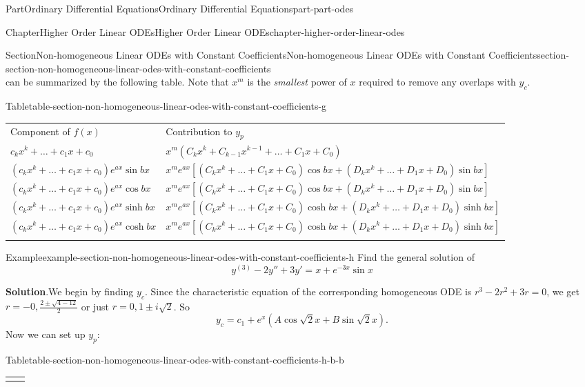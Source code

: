 \documentclass[twoside,10pt,]{book}
\newcommand{\blocktitlefont}{\relax}
\newcommand{\tabularfont}{\relax}
\numberwithin{equation}{part}
\newcommand{\hrulethick} {\noalign{\hrule height 0.11em}}
\newcommand{\brackets}[1]{\left[ #1 \right]}
\begin{document}
\begin{partptx}{Part}{Ordinary Differential Equations}{}{Ordinary Differential Equations}{}{}{part-part-odes}
\begin{chapterptx}{Chapter}{Higher Order Linear ODEs}{}{Higher Order Linear ODEs}{}{}{chapter-higher-order-linear-odes}
\begin{sectionptx}{Section}{Non-homogeneous Linear ODEs with Constant Coefficients}{}{Non-homogeneous Linear ODEs with Constant Coefficients}{}{}{section-section-non-homogeneous-linear-odes-with-constant-coefficients}
\begin{equation*}
\end{equation*}
can be summarized by the following table. Note that \(x^m\) is the \emph{smallest} power of \(x\) required to remove any overlaps with \(y_{c}\).%
\begin{tableptx}{Table}{\textbf{}}{table-section-non-homogeneous-linear-odes-with-constant-coefficients-g}{}%
\centering%
{\tabularfont%
\begin{tabular}{ll}\hrulethick
Component of \(f(x)\)&Contribution to \(y_{p}\)\tabularnewline\hrulethick
\(c_{k}x^{k}+\dots+c_{1}x+c_{0}\)&\(x^{m}(C_{k}x^{k}+C_{k-1}x^{k-1}+\dots+C_{1}x+C_{0})\)\tabularnewline[0pt]
\((c_{k}x^{k}+\dots+c_{1}x+c_{0})e^{ax}\sin bx\)&\(x^{m}e^{ax}\brackets{(C_{k}x^{k}+\dots+C_{1}x+C_{0})\cos bx+(D_{k}x^{k}+\dots+D_{1}x+D_{0})\sin bx}\)\tabularnewline[0pt]
\((c_{k}x^{k}+\dots+c_{1}x+c_{0})e^{ax}\cos bx\)&\(x^{m}e^{ax}\brackets{(C_{k}x^{k}+\dots+C_{1}x+C_{0})\cos bx+(D_{k}x^{k}+\dots+D_{1}x+D_{0})\sin bx}\)\tabularnewline[0pt]
\((c_{k}x^{k}+\dots+c_{1}x+c_{0})e^{ax}\sinh bx\)&\(x^{m}e^{ax}\brackets{(C_{k}x^{k}+\dots+C_{1}x+C_{0})\cosh bx+(D_{k}x^{k}+\dots+D_{1}x+D_{0})\sinh bx}\)\tabularnewline[0pt]
\((c_{k}x^{k}+\dots+c_{1}x+c_{0})e^{ax}\cosh bx\)&\(x^{m}e^{ax}\brackets{(C_{k}x^{k}+\dots+C_{1}x+C_{0})\cosh bx+(D_{k}x^{k}+\dots+D_{1}x+D_{0})\sinh bx}\)\tabularnewline\hrulethick
\end{tabular}
}%
\end{tableptx}%
\begin{example}{Example}{}{example-section-non-homogeneous-linear-odes-with-constant-coefficients-h}%
Find the general solution of%
\begin{equation*}
y^{(3)}-2y''+3y'= x+e^{-3x}\sin x
\end{equation*}
%
\par\smallskip%
\noindent\textbf{\blocktitlefont Solution}.\hypertarget{solution-section-non-homogeneous-linear-odes-with-constant-coefficients-h-b}{}\quad{}We begin by finding \(y_{c}\). Since the characteristic equation of the corresponding homogeneous ODE is \(r^{3}-2r^{2}+3r=0\), we get \(r=-0,\frac{2\pm\sqrt{4-12}}{2}\) or just \(r=0,1\pm i\sqrt{2}\). So%
\begin{equation*}
y_{c} = c_{1}+e^{x}(A\cos\sqrt{2}x+B\sin\sqrt{2}x).
\end{equation*}
Now we can set up \(y_{p}\):%
\begin{tableptx}{Table}{\textbf{}}{table-section-non-homogeneous-linear-odes-with-constant-coefficients-h-b-b}{}%
\centering%
{\tabularfont%
\begin{tabular}{ll}\hrulethick

\end{tabular}}
\end{tableptx}
\end{example}
\end{sectionptx}
\end{chapterptx}
\end{partptx}
\end{document}

